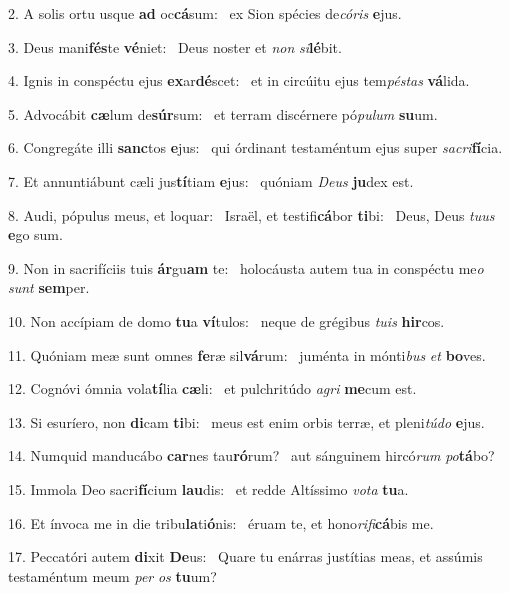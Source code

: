 2. A solis ortu usque \textbf{ad} oc\textbf{cá}sum: \ast\  ex Sion spécies de\textit{có}\textit{ris} \textbf{e}jus.\

3. Deus mani\textbf{fés}te \textbf{vé}niet: \ast\  Deus noster et \textit{non} \textit{si}\textbf{lé}bit.\

4. Ignis in conspéctu ejus \textbf{ex}ar\textbf{dé}scet: \ast\  et in circúitu ejus tem\textit{pés}\textit{tas} \textbf{vá}lida.\

5. Advocábit \textbf{cæ}lum de\textbf{súr}sum: \ast\  et terram discérnere pó\textit{pu}\textit{lum} \textbf{su}um.\

6. Congregáte illi \textbf{sanc}tos \textbf{e}jus: \ast\  qui órdinant testaméntum ejus super \textit{sa}\textit{cri}\textbf{fí}cia.\

7. Et annuntiábunt cæli jus\textbf{tí}tiam \textbf{e}jus: \ast\  quóniam \textit{De}\textit{us} \textbf{ju}dex est.\

8. Audi, pópulus meus, et loquar: \dag\  Israël, et testifi\textbf{cá}bor \textbf{ti}bi: \ast\  Deus, Deus \textit{tu}\textit{us} \textbf{e}go sum.\

9. Non in sacrifíciis tuis \textbf{ár}gu\textbf{am} te: \ast\  holocáusta autem tua in conspéctu me\textit{o} \textit{sunt} \textbf{sem}per.\

10. Non accípiam de domo \textbf{tu}a \textbf{ví}tulos: \ast\  neque de grégibus \textit{tu}\textit{is} \textbf{hir}cos.\

11. Quóniam meæ sunt omnes \textbf{fe}ræ sil\textbf{vá}rum: \ast\  juménta in mónti\textit{bus} \textit{et} \textbf{bo}ves.\

12. Cognóvi ómnia vola\textbf{tí}lia \textbf{cæ}li: \ast\  et pulchritúdo \textit{a}\textit{gri} \textbf{me}cum est.\

13. Si esuríero, non \textbf{di}cam \textbf{ti}bi: \ast\  meus est enim orbis terræ, et pleni\textit{tú}\textit{do} \textbf{e}jus.\

14. Numquid manducábo \textbf{car}nes tau\textbf{ró}rum? \ast\  aut sánguinem hircó\textit{rum} \textit{po}\textbf{tá}bo?\

15. Immola Deo sacri\textbf{fí}cium \textbf{lau}dis: \ast\  et redde Altíssimo \textit{vo}\textit{ta} \textbf{tu}a.\

16. Et ínvoca me in die tribu\textbf{la}ti\textbf{ó}nis: \ast\  éruam te, et hono\textit{ri}\textit{fi}\textbf{cá}bis me.\

17. Peccatóri autem \textbf{di}xit \textbf{De}us: \ast\  Quare tu enárras justítias meas, et assúmis testaméntum meum \textit{per} \textit{os} \textbf{tu}um?\

